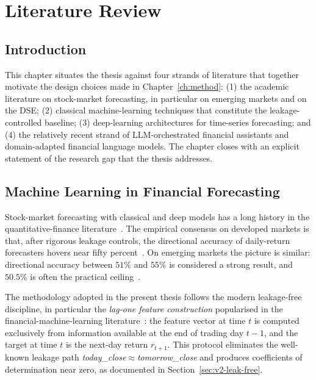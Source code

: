 \documentclass[12pt,a4paper,oneside]{report}
\begin{document}
\chapter{Literature Review}
\label{ch:lit}

\section{Introduction}

This chapter situates the thesis against four strands of literature
that together motivate the design choices made in
Chapter~\ref{ch:method}: (1) the academic literature on stock-market
forecasting, in particular on emerging markets and on the DSE; (2)
classical machine-learning techniques that constitute the
leakage-controlled baseline; (3) deep-learning architectures for
time-series forecasting; and (4) the relatively recent strand of
\ac{LLM}-orchestrated financial assistants and domain-adapted
financial language models. The chapter closes with an explicit
statement of the research gap that the thesis addresses.

\section{Machine Learning in Financial Forecasting}

Stock-market forecasting with classical and deep models has a
long history in the quantitative-finance literature~\cite{tsay2010analysis,sezer2020financial}.
The empirical consensus on developed markets is that, after
rigorous leakage controls, the directional accuracy of
daily-return forecasters hovers near fifty percent~\cite{bailey2014stock,rapach2010forecasting}.
On emerging markets the picture is similar: directional accuracy
between $51\%$ and $55\%$ is considered a strong result, and $50.5\%$
is often the practical ceiling~\cite{hossain2019dse,islam2018forecasting}.

The methodology adopted in the present thesis follows the modern
leakage-free discipline, in particular the \emph{lag-one feature
construction} popularised in the financial-machine-learning
literature~\cite{bailey2014stock}: the feature vector at time $t$ is
computed exclusively from information available at the end of
trading day $t-1$, and the target at time $t$ is the next-day return
$r_{t+1}$. This protocol eliminates the well-known leakage path
\textit{today\_close}$\approx$\textit{tomorrow\_close} and produces
coefficients of determination near zero, as documented in
Section~\ref{sec:v2-leak-free}.
\end{document}
